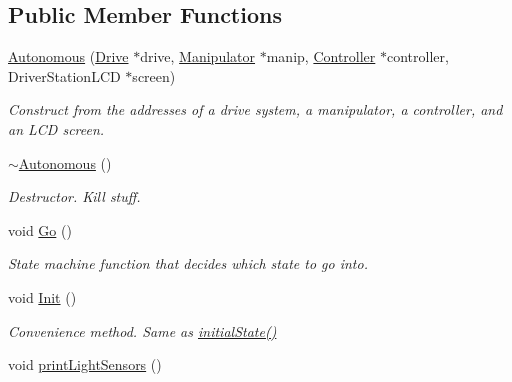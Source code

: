 \subsection*{Public Member Functions}
\begin{DoxyCompactItemize}
\item 
\hyperlink{class_r_j_f_r_c2011_1_1_autonomous_a747bcf35b9790d7b69b14f4303496418}{Autonomous} (\hyperlink{class_r_j_f_r_c2011_1_1_drive}{Drive} $\ast$drive, \hyperlink{class_r_j_f_r_c2011_1_1_manipulator}{Manipulator} $\ast$manip, \hyperlink{class_r_j_f_r_c2011_1_1_controller}{Controller} $\ast$controller, DriverStationLCD $\ast$screen)
\begin{DoxyCompactList}\small\item\em Construct from the addresses of a drive system, a manipulator, a controller, and an LCD screen. \item\end{DoxyCompactList}\item 
\hypertarget{class_r_j_f_r_c2011_1_1_autonomous_a556fc6fc020f18c7bbe6cde03ef81ea4}{
\hyperlink{class_r_j_f_r_c2011_1_1_autonomous_a556fc6fc020f18c7bbe6cde03ef81ea4}{$\sim$Autonomous} ()}
\label{class_r_j_f_r_c2011_1_1_autonomous_a556fc6fc020f18c7bbe6cde03ef81ea4}

\begin{DoxyCompactList}\small\item\em Destructor. Kill stuff. \item\end{DoxyCompactList}\item 
void \hyperlink{class_r_j_f_r_c2011_1_1_autonomous_ab7959f947b71d84b03f53c8e91a542f6}{Go} ()
\begin{DoxyCompactList}\small\item\em State machine function that decides which state to go into. \item\end{DoxyCompactList}\item 
\hypertarget{class_r_j_f_r_c2011_1_1_autonomous_a8cae3af2e3d40459b013583ccec77da6}{
void \hyperlink{class_r_j_f_r_c2011_1_1_autonomous_a8cae3af2e3d40459b013583ccec77da6}{Init} ()}
\label{class_r_j_f_r_c2011_1_1_autonomous_a8cae3af2e3d40459b013583ccec77da6}

\begin{DoxyCompactList}\small\item\em Convenience method. Same as {\itshape \hyperlink{class_r_j_f_r_c2011_1_1_autonomous_a1f04427d07d9569a9f746445c82b8173}{initialState()}\/} \item\end{DoxyCompactList}\item 
\hypertarget{class_r_j_f_r_c2011_1_1_autonomous_ae35c0e29665ed5812645bec8acbbd965}{
void \hyperlink{class_r_j_f_r_c2011_1_1_autonomous_ae35c0e29665ed5812645bec8acbbd965}{printLightSensors} ()}
\label{class_r_j_f_r_c2011_1_1_autonomous_ae35c0e29665ed5812645bec8acbbd965}


\end{DoxyCompactItemize}
